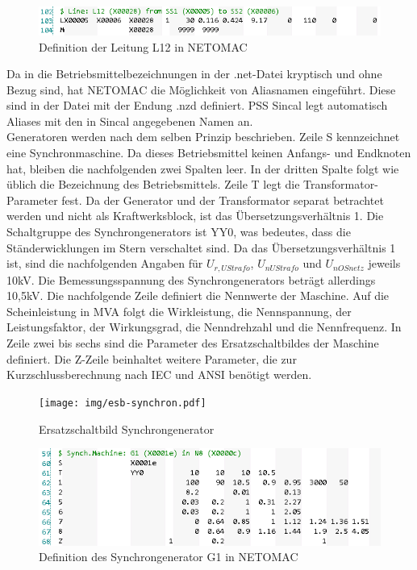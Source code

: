 \documentclass{scrartcl}
\begin{document}
\begin{onehalfspace}
	\begin{figure}[H]
	\centering
	\includegraphics[scale=0.75]{img/netomac-l12.png}
	\caption{Definition der Leitung L12 in NETOMAC}
	\label{leitung-netomac}
	\end{figure}
	
Da in die Betriebsmittelbezeichnungen in der .net-Datei kryptisch und ohne Bezug sind, hat NETOMAC die Möglichkeit von Aliasnamen eingeführt. Diese sind in der Datei mit der Endung .nzd definiert. PSS Sincal legt automatisch Aliases mit den in Sincal angegebenen Namen an. \\
Generatoren werden nach dem selben Prinzip beschrieben. Zeile S kennzeichnet eine Synchronmaschine. Da dieses Betriebsmittel keinen Anfangs- und Endknoten hat, bleiben die nachfolgenden zwei Spalten leer. In der dritten Spalte folgt wie üblich die Bezeichnung des Betriebsmittels. Zeile T legt die Transformator-Parameter fest. Da der Generator und der Transformator separat betrachtet werden und nicht als Kraftwerksblock, ist das Übersetzungsverhältnis 1. Die Schaltgruppe des Synchrongenerators ist YY0, was bedeutes, dass die Ständerwicklungen im Stern verschaltet sind. Da das Übersetzungsverhältnis 1 ist, sind die nachfolgenden Angaben für $U_{r,UStrafo}$, $U_{nUStrafo}$ und $U_{nOSnetz}$ jeweils 10kV. Die Bemessungsspannung des Synchrongenerators beträgt allerdings 10,5kV. Die nachfolgende Zeile definiert die Nennwerte der Maschine. Auf die Scheinleistung in MVA folgt die Wirkleistung, die Nennspannung, der Leistungsfaktor, der Wirkungsgrad, die Nenndrehzahl und die Nennfrequenz. In Zeile zwei bis sechs sind die Parameter des Ersatzschaltbildes der Maschine definiert. Die Z-Zeile beinhaltet weitere Parameter, die zur Kurzschlussberechnung nach IEC und ANSI benötigt werden.

	\begin{figure}[H]
	\centering
	\texttt{[image: img/esb-synchron.pdf]}
	\caption{Ersatzschaltbild Synchrongenerator}
	\label{leitung-netomac}
	\end{figure}

	\begin{figure}[H]
	\centering
	\includegraphics[scale=0.75]{img/netomac-g1.png}
	\caption{Definition des Synchrongenerator G1 in NETOMAC}
	\label{leitung-netomac}
	\end{figure}


\end{onehalfspace}
\end{document}
